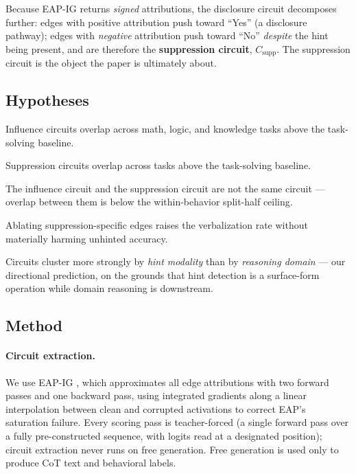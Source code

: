 \documentclass[11pt]{article}
\begin{document}
Because EAP-IG returns \emph{signed} attributions, the disclosure circuit decomposes further: edges with positive attribution push toward ``Yes'' (a disclosure pathway); edges with \emph{negative} attribution push toward ``No'' \emph{despite} the hint being present, and are therefore the \textbf{suppression circuit}, $C_{\text{supp}}$. The suppression circuit is the object the paper is ultimately about.

\subsection{Hypotheses}
\label{sec:hypotheses}

\begin{description}[leftmargin=1.5em, itemsep=2pt]
  \item[H1 (cross-task influence).] Influence circuits overlap across math, logic, and knowledge tasks above the task-solving baseline.
  \item[H2 (cross-task suppression).] Suppression circuits overlap across tasks above the task-solving baseline.
  \item[H3 (separability).] The influence circuit and the suppression circuit are not the same circuit --- overlap between them is below the within-behavior split-half ceiling.
  \item[H4 (intervention).] Ablating suppression-specific edges raises the verbalization rate without materially harming unhinted accuracy.
  \item[H5 (organizing axis).] Circuits cluster more strongly by \emph{hint modality} than by \emph{reasoning domain} --- our directional prediction, on the grounds that hint detection is a surface-form operation while domain reasoning is downstream.
\end{description}

\subsection{Method}
\label{sec:method}

\paragraph{Circuit extraction.} We use EAP-IG \citep{hanna2024}, which approximates all edge attributions with two forward passes and one backward pass, using integrated gradients along a linear interpolation between clean and corrupted activations to correct EAP's saturation failure. Every scoring pass is teacher-forced (a single forward pass over a fully pre-constructed sequence, with logits read at a designated position); circuit extraction never runs on free generation. Free generation is used only to produce CoT text and behavioral labels.
\end{document}
